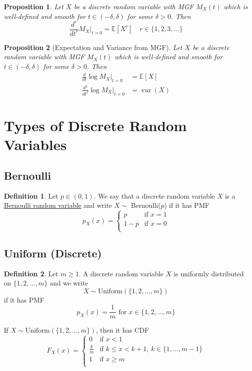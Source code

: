 \documentclass[
]{article}
\newtheorem{proposition}{Proposition}[section]
\theoremstyle{definition}
\newtheorem{definition}{Definition}[section]
\theoremstyle{definition}
\theoremstyle{definition}
\theoremstyle{remark}
\newcommand{\pxx}{p_X(x)}
\newcommand{\E}[1]{\mathbb{E}[#1]}
\newcommand{\varx}{\operatorname{var}(X)}
\begin{document}
\begin{proposition}
  Let $X$ be a discrete random variable with MGF $M_X(t)$ which is well-defined and smooth for $t\in(-\delta,\delta)$ for some $\delta>0$. Then
  \[\frac{d^r}{dt^r}M_X\big|_{t=0}=\E{X^r}\quad r\in\{1,2,3,\dots\}\]
\end{proposition}

\begin{proposition}[Expectation and Variance from MGF]
  Let $X$ be a discrete random variable with MGF $M_X(t)$ which is well-defined and smooth for $t\in(-\delta,\delta)$ for some $\delta>0$. Then
  \begin{align*}
    \frac{d}{dt}\log M_X\big|_{t=0}     & =\E{X} \\
    \frac{d^2}{dt^2}\log M_X\big|_{t=0} & =\varx
  \end{align*}
\end{proposition}

\section{Types of Discrete Random Variables}

\subsection{Bernoulli}

\begin{definition}
  Let $p\in(0,1)$. We say that a discrete random variable $X$ is a \underline{Bernoulli random variable} and write $X\sim$ Bernoulli($p$) if it has PMF
  \[\pxx=\begin{cases}
      p   & \text{if }x=1 \\
      1-p & \text{if }x=0 \\
    \end{cases}\]
\end{definition}

\subsection{Uniform (Discrete)}

\begin{definition}
  Let $m\geq 1$. A discrete random variable $X$ is uniformly distributed on $\{1,2,\dots,m\}$ and we write \[X\sim\text{Uniform}(\{1,2,\dots,m\})\] if it has PMF \[p_X(x)=\frac{1}{m}\text{ for }x\in\{1,2,\dots,m\}\]

  If $X\sim\text{Uniform}(\{1,2,\dots,m\})$, then it has CDF
  \[F_X(x)=
    \begin{cases}
      0           & \text{if }x<1                               \\
      \frac{k}{m} & \text{if }k\leq x<k+1,\ k\in\{1,\dots,m-1\} \\
      1           & \text{if }x\geq m                           \\
    \end{cases}
  \]
\end{definition}
\end{document}
